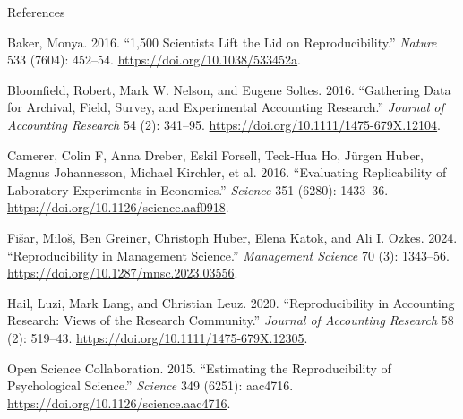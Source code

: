 \documentclass[
  ignorenonframetext,
  aspectratio=169,
]{beamer}
\newlength{\cslhangindent}
\newenvironment{CSLReferences}[2] %
 {\begin{list}{}{%
  \setlength{\itemindent}{0pt}
  \setlength{\leftmargin}{0pt}
  \setlength{\parsep}{0pt}
  \ifodd #1
   \setlength{\leftmargin}{\cslhangindent}
   \setlength{\itemindent}{-1\cslhangindent}
  \fi
  \setlength{\itemsep}{#2\baselineskip}}}
 {\end{list}}
\begin{document}
\begin{frame}[allowframebreaks]{References}
\label{references}
\footnotesize

\label{refs}
\begin{CSLReferences}{1}{0}
Baker, Monya. 2016. {``1,500 Scientists Lift the Lid on
Reproducibility.''} \emph{Nature} 533 (7604): 452--54.
\url{https://doi.org/10.1038/533452a}.

Bloomfield, Robert, Mark W. Nelson, and Eugene Soltes. 2016.
{``Gathering Data for Archival, Field, Survey, and Experimental
Accounting Research.''} \emph{Journal of Accounting Research} 54 (2):
341--95. \url{https://doi.org/10.1111/1475-679X.12104}.

Camerer, Colin F, Anna Dreber, Eskil Forsell, Teck-Hua Ho, Jürgen Huber,
Magnus Johannesson, Michael Kirchler, et al. 2016. {``Evaluating
Replicability of Laboratory Experiments in Economics.''} \emph{Science}
351 (6280): 1433--36. \url{https://doi.org/10.1126/science.aaf0918}.

Fišar, Miloš, Ben Greiner, Christoph Huber, Elena Katok, and Ali I.
Ozkes. 2024. {``Reproducibility in Management Science.''}
\emph{Management Science} 70 (3): 1343--56.
\url{https://doi.org/10.1287/mnsc.2023.03556}.

Hail, Luzi, Mark Lang, and Christian Leuz. 2020. {``Reproducibility in
Accounting Research: Views of the Research Community.''} \emph{Journal
of Accounting Research} 58 (2): 519--43.
\url{https://doi.org/10.1111/1475-679X.12305}.

Open Science Collaboration. 2015. {``Estimating the Reproducibility of
Psychological Science.''} \emph{Science} 349 (6251): aac4716.
\url{https://doi.org/10.1126/science.aac4716}.

\end{CSLReferences}
\end{frame}
\end{document}
